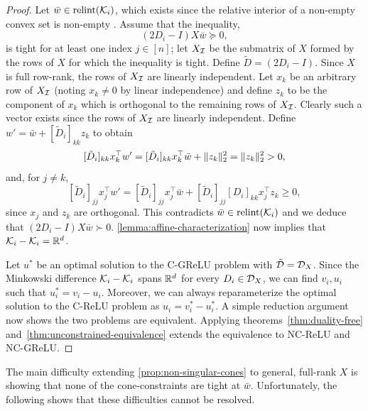 \nonSingularCones*
\begin{proof}
    Let \( \bar w \in \text{relint} (\mathcal{K}_i) \), which exists since the relative interior of a non-empty convex set is non-empty \citep{bertsekas2009convex}.
    Assume that the inequality,
    \[
        (2 D_i - I) X \bar w \succeq 0,
    \]
    is tight for at least one index \( j \in [n] \);
    let \( X_{\mathcal{I}} \) be the submatrix of \( X \) formed by the rows of \( X \) for which the inequality
    is tight.
    Define \( \tilde D =  (2 D_i - I) \).
    Since \( X \) is full row-rank, the rows of \( X_{\mathcal{I}} \) are linearly independent.
    Let \( x_k \) be an arbitrary row of \( X_{\mathcal{I}} \) (noting \( x_k \neq 0 \) by linear independence) and define \( z_k \) to be the component of \( x_k \) which is orthogonal to the remaining rows of \( X_{\mathcal{I}} \).
    Clearly such a vector exists since the rows of \( X_{\mathcal{I}} \) are linearly independent.
    Define \( w' = \bar w + [\tilde D_i]_{kk} z_k \) to obtain
    \[
        [\tilde D_i]_{kk} x_k^\top w' = [\tilde D_i]_{kk} x_k^\top \bar w + \|z_k\|_2^2 = \|z_k\|_2^2 > 0,
    \]
    and, for \( j \neq k \),
    \[
        [\tilde D_i]_{jj} x_j^\top w' = [\tilde D_i]_{jj} x_{j}^\top \bar w + [\tilde D_i]_{jj} [D_i]_{kk} x_{j}^\top z_k \geq 0,
    \]
    since \( x_j \) and \( z_k \) are orthogonal.
    This contradicts \( \bar w \in \text{relint} (\mathcal{K}_i) \) and we deduce that \( (2 D_i - I) X \bar w \succ 0 \).
    \cref{lemma:affine-characterization} now implies that \( \mathcal{K}_i - \mathcal{K}_i = \mathbb{R}^d \).

    Let \( u^* \) be an optimal solution to the C-GReLU problem with \( \tilde {\mathcal{D}} = \mathcal{D}_X \).
    Since the Minkowski difference \( \mathcal{K}_i - \mathcal{K}_i \) spans \( \mathbb{R}^d \) for every \( D_i \in \mathcal{D}_X \), we can find \( v_i, u_i \)  such that \( u_i^* = v_i - u_i \).
    Moreover, we can always reparameterize the optimal solution to the C-ReLU problem as \( u_i = v_i^* - u_i^* \).
    A simple reduction argument now shows the two problems are equivalent.
    Applying theorems~\ref{thm:duality-free} and~\ref{thm:unconstrained-equivalence} extends the equivalence to NC-ReLU and NC-GReLU.
\end{proof}

The main difficulty extending \cref{prop:non-singular-cones} to general, full-rank \( X \) is showing that none of the cone-constraints are tight at \( \bar w \).
Unfortunately, the following shows that these difficulties cannot be resolved.

